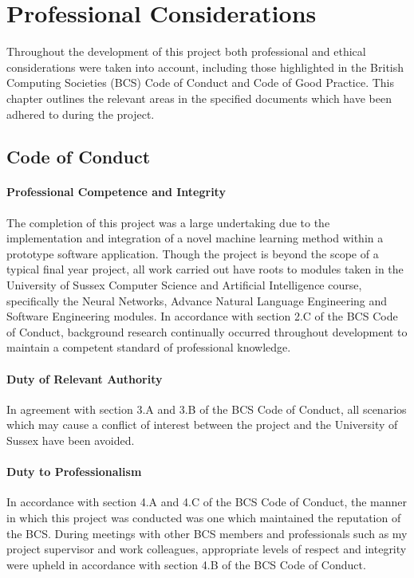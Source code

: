 \chapter{Professional Considerations}
\label{prof_con}
Throughout the development of this project both professional and ethical considerations were taken into account, including those highlighted in the British Computing Societies (BCS) Code of Conduct and Code of Good Practice. This chapter outlines the relevant areas in the specified documents which have been adhered to during the project.

\section{Code of Conduct}
\subsubsection{Professional Competence and Integrity}
The completion of this project was a large undertaking due to the implementation and integration of a novel machine learning method within a prototype software application. Though the project is beyond the scope of a typical final year project, all work carried out have roots to modules taken in the University of Sussex Computer Science and Artificial Intelligence course, specifically the Neural Networks, Advance Natural Language Engineering and Software Engineering modules. In accordance with section 2.C of the BCS Code of Conduct, background research continually occurred throughout development to maintain a competent standard of professional knowledge.

\subsubsection{Duty of Relevant Authority}
In agreement with section 3.A and 3.B of the BCS Code of Conduct, all scenarios which may cause a conflict of interest between the project and the University of Sussex have been avoided.

\subsubsection{Duty to Professionalism}
In accordance with section 4.A and 4.C of the BCS Code of Conduct, the manner in which this project was conducted was one which maintained the reputation of the BCS. During meetings with other BCS members and professionals such as my project supervisor and work colleagues, appropriate levels of respect and integrity were upheld in accordance with section 4.B of the BCS Code of Conduct.

